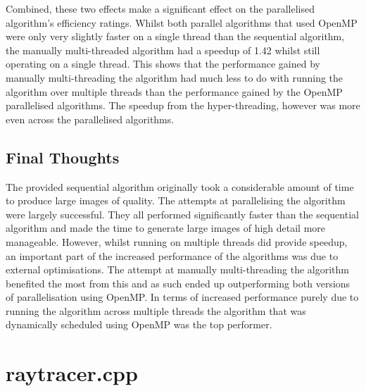 \documentclass[12pt,journal,transmag]{IEEEtran}
\begin{document}
	Combined, these two effects make a significant effect on the parallelised algorithm's efficiency ratings. Whilst both parallel algorithms that used OpenMP were only very slightly faster on a single thread than the sequential algorithm, the manually multi-threaded algorithm had a speedup of 1.42 whilst still operating on a single thread. This shows that the performance gained by manually multi-threading the algorithm had much less to do with running the algorithm over multiple threads than the performance gained by the OpenMP parallelised algorithms. The speedup from the hyper-threading, however was more even across the parallelised algorithms.
	
	\subsection{Final Thoughts}
	The provided sequential algorithm originally took a considerable amount of time to produce large images of quality. The attempts at parallelising the algorithm were largely successful. They all performed significantly faster than the sequential algorithm and made the time to generate large images of high detail more manageable. However, whilst running on multiple threads did provide speedup, an important part of the increased performance of the algorithms was due to external optimisations. The attempt at manually multi-threading the algorithm benefited the most from this and as such ended up outperforming both versions of parallelisation using OpenMP. In terms of increased performance purely due to running the algorithm across multiple threads the algorithm that was dynamically scheduled using OpenMP was the top performer.
	
	
	
	
	\newpage
	\onecolumn
	\appendices
	\section{raytracer.cpp}
	
	
\end{document}
